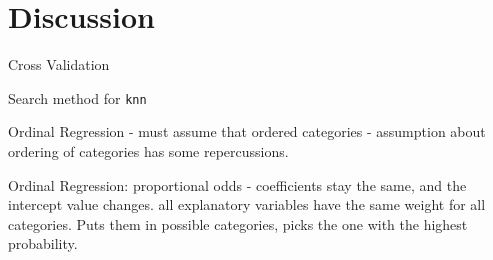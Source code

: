 \documentclass{beamer}
\begin{document}
\section{Discussion}
\begin{frame}{}
Cross Validation

Search method for \texttt{knn}

Ordinal Regression - must assume that 
ordered categories - assumption about ordering of categories has some repercussions.

Ordinal Regression: proportional odds - coefficients stay the same, and the intercept value changes. all explanatory variables have the same weight for all categories. Puts them in possible categories, picks the one with the highest probability. 

\end{frame}
\end{document}
